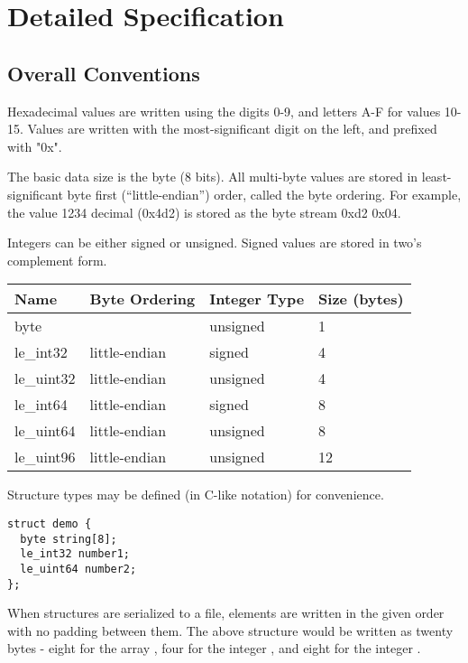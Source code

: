 \section{Detailed Specification}
%
\subsection{Overall Conventions}

Hexadecimal values are written using the digits 0-9, and letters A-F for values 10-15.
%
Values are written with the most-significant digit on the left, and prefixed with "0x".

The basic data size is the byte (8 bits).
%
All multi-byte values are stored in least-significant byte first (``little-endian'') order, called the byte ordering.
%
For example, the value 1234 decimal (0x4d2) is stored as the byte stream 0xd2 0x04.

Integers can be either signed or unsigned.
%
Signed values are stored in two's complement form.

\begin{center}
\begin{tabular}{l l l l}
\hline
\textbf{Name} & \textbf{Byte Ordering} & \textbf{Integer Type} & \textbf{Size (bytes)} \\
\hline
byte & & unsigned & 1 \\
le\_int32 & little-endian & signed & 4 \\
le\_uint32 & little-endian & unsigned & 4 \\
le\_int64 & little-endian & signed & 8 \\
le\_uint64 & little-endian & unsigned & 8 \\
le\_uint96 & little-endian & unsigned & 12 \\
\end{tabular}
\end{center}

Structure types may be defined (in C-like notation) for convenience.

\begin{verbatim}
struct demo {
  byte string[8];
  le_int32 number1;
  le_uint64 number2;
};
\end{verbatim}

When structures are serialized to a file, elements are written in the given order with no padding between them.
%
The above structure would be written as twenty bytes - eight for the array , four for the integer , and eight for the integer .

